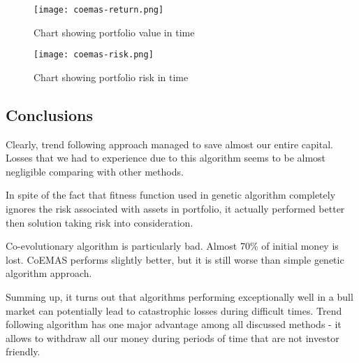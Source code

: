\begin{figure}[ht]
  \begin{center}
    \texttt{[image: coemas-return.png]}
  \end{center}
  \caption{Chart showing portfolio value in time}
  \label{fig:agent_2008_return}
\end{figure}


\begin{figure}[ht]
  \begin{center}
    \texttt{[image: coemas-risk.png]}
  \end{center}
  \caption{Chart showing portfolio risk in time}
  \label{fig:agent_2008_risk}
\end{figure}

\subsection{Conclusions}

Clearly, trend following approach managed to save almost our entire capital.
Losses that we had to experience due to this algorithm seems to be almost negligible comparing with other methods.

In spite of the fact that fitness function used in genetic algorithm completely ignores the risk associated with assets in portfolio,       it actually performed better then solution taking risk into consideration.

Co-evolutionary algorithm is particularly bad. 
Almost 70\% of initial money is lost. CoEMAS performs slightly better, but it is still worse than simple genetic algorithm approach.

Summing up, it turns out that algorithms performing exceptionally well in a bull market can potentially lead to catastrophic losses during
difficult times. 
Trend following algorithm has one major advantage among all discussed methods - it allows to withdraw all our money during periods of time
that are not investor friendly.